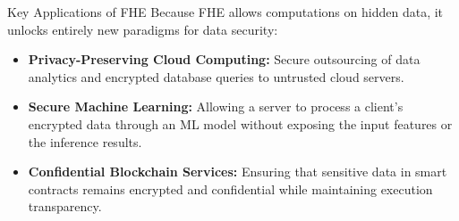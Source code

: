 \documentclass[aspectratio=169, 10pt]{beamer}
\begin{document}
\begin{frame}{Key Applications of FHE}
    Because FHE allows computations on hidden data, it unlocks entirely new paradigms for data security:
    \vspace{0.4cm}
    
    \begin{itemize}
        \item[\faCloud] \textbf{Privacy-Preserving Cloud Computing:} Secure outsourcing of data analytics and encrypted database queries to untrusted cloud servers.
        \vspace{0.3cm}
        \item[\faRobot] \textbf{Secure Machine Learning:} Allowing a server to process a client's encrypted data through an ML model without exposing the input features or the inference results.
        \vspace{0.3cm}
        \item[\faLink] \textbf{Confidential Blockchain Services:} Ensuring that sensitive data in smart contracts remains encrypted and confidential while maintaining execution transparency.
    \end{itemize}
\end{frame}
\end{document}
